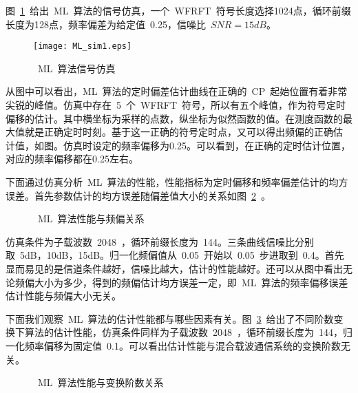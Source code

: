 图~\ref{ML_sim1}~给出~ML~算法的信号仿真，一个~WFRFT~符号长度选择1024点，循环前缀长度为128点，频率偏差为给定值~0.25，信噪比~$SNR=15dB$。
\begin{figure}[htbp]
\centering
\texttt{[image: ML\_sim1.eps]}
\caption{~ML~算法信号仿真}\vspace{-1em}\label{ML_sim1}
\end{figure}
从图中可以看出，ML~算法的定时偏差估计曲线在正确的~CP~起始位置有着非常尖锐的峰值。仿真中存在~5~个~WFRFT~符号，所以有五个峰值，作为符号定时偏移的估计。其中横坐标为采样的点数，纵坐标为似然函数的值。在测度函数的最大值就是正确定时时刻。基于这一正确的符号定时点，又可以得出频偏的正确估
计值，如图。仿真时设定的频率偏移为0.25。可以看到，在正确的定时估计位置，对应的频率偏移都在0.25左右。

下面通过仿真分析~ML~算法的性能，性能指标为定时偏移和频率偏差估计的均方误差。首先参数估计的均方误差随偏差值大小的关系如图~\ref{Performance_by_freqError}~。
\begin{figure}[htbp]
\centering
{}
\caption{~ML~算法性能与频偏关系}\label{Performance_by_freqError}
\vspace{-1em}
\end{figure}
仿真条件为子载波数~2048~，循环前缀长度为~144。三条曲线信噪比分别取~5dB，10dB，15dB。归一化频偏值从~0.05~开始以~0.05~步进取到~0.4。首先显而易见的是信道条件越好，信噪比越大，估计的性能越好。还可以从图中看出无论频偏大小为多少，得到的频偏估计均方误差一定，即~ML~算法的频率偏移误差估计性能与频偏大小无关。

下面我们观察~ML~算法的估计性能都与哪些因素有关。图~\ref{Performance_by_alpha}~给出了不同阶数变换下算法的估计性能，仿真条件同样为子载波数~2048~，循环前缀长度为~144，归一化频率偏移为固定值~0.1。可以看出估计性能与混合载波通信系统的变换阶数无关。
\begin{figure}[htbp]
\centering
{}
\caption{~ML~算法性能与变换阶数关系}\label{Performance_by_alpha}
\vspace{-1em}
\end{figure}

